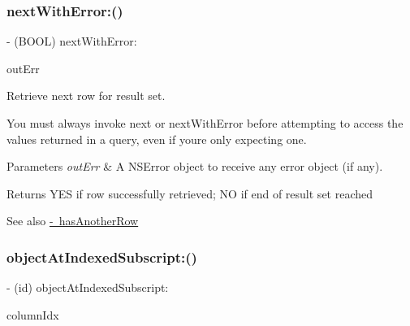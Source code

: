 \subsubsection{\texorpdfstring{next\+With\+Error\+:()}{nextWithError:()}}
{\footnotesize\ttfamily -\/ (B\+O\+OL) next\+With\+Error\+: \begin{DoxyParamCaption}\item[{(N\+S\+Error $\ast$\+\_\+\+Nullable $\ast$)}]{out\+Err }\end{DoxyParamCaption}}

Retrieve next row for result set.

You must always invoke {\ttfamily next} or {\ttfamily next\+With\+Error} before attempting to access the values returned in a query, even if you\textquotesingle{}re only expecting one.


\begin{DoxyParams}{Parameters}
{\em out\+Err} & A \textquotesingle{}N\+S\+Error\textquotesingle{} object to receive any error object (if any).\\
\hline
\end{DoxyParams}
\begin{DoxyReturn}{Returns}
\textquotesingle{}Y\+ES\textquotesingle{} if row successfully retrieved; \textquotesingle{}NO\textquotesingle{} if end of result set reached
\end{DoxyReturn}
\begin{DoxySeeAlso}{See also}
\mbox{\hyperlink{interface_o_p_t_l_y_f_m_d_b_result_set_aba289dd61c9163a368b2898ab3aea0ae}{-\/ has\+Another\+Row}} 
\end{DoxySeeAlso}
\mbox{\label{interface_o_p_t_l_y_f_m_d_b_result_set_a497f36dbe6e774a9951b329d4bb7f4b1}} 
\subsubsection{\texorpdfstring{object\+At\+Indexed\+Subscript\+:()}{objectAtIndexedSubscript:()}}
{\footnotesize\ttfamily -\/ (id) object\+At\+Indexed\+Subscript\+: \begin{DoxyParamCaption}\item[{(int)}]{column\+Idx }\end{DoxyParamCaption}}

